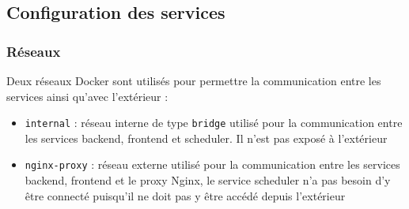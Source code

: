 \subsection{Configuration des services}

\subsubsection{Réseaux}
Deux réseaux Docker sont utilisés pour permettre la communication entre les services ainsi qu'avec l'extérieur :
\begin{itemize}
    \item[$\bullet$] \texttt{internal} : réseau interne de type \texttt{bridge} utilisé pour la communication entre les services backend, frontend et scheduler. Il n'est pas exposé à l'extérieur
    \item[$\bullet$] \texttt{nginx-proxy} : réseau externe utilisé pour la communication entre les services backend, frontend et le proxy Nginx, le service scheduler n'a pas besoin d'y être connecté puisqu'il ne doit pas y être accédé depuis l'extérieur
\end{itemize}

